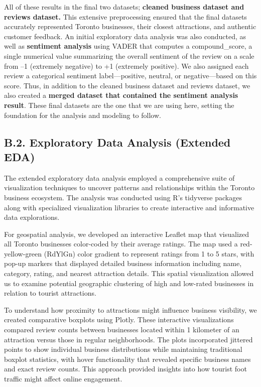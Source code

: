 \documentclass[
]{article}
\begin{document}
All of these results in the final two datasets; \textbf{cleaned business
dataset and reviews dataset.} This extensive preprocessing ensured that
the final datasets accurately represented Toronto businesses, their
closest attractions, and authentic customer feedback. An initial
exploratory data analysis was also conducted, as well as
\textbf{sentiment analysis} using VADER that computes a compound\_score,
a single numerical value summarizing the overall sentiment of the review
on a scale from --1 (extremely negative) to +1 (extremely positive). We
also assigned each review a categorical sentiment label---positive,
neutral, or negative---based on this score. Thus, in addition to the
cleaned business dataset and reviews dataset, we also created a
\textbf{merged dataset that contained the sentiment analysis result}.
These final datasets are the one that we are using here, setting the
foundation for the analysis and modeling to follow.

\subsection{B.2. Exploratory Data Analysis (Extended
EDA)}\label{b.2.-exploratory-data-analysis-extended-eda}

The extended exploratory data analysis employed a comprehensive suite of
visualization techniques to uncover patterns and relationships within
the Toronto business ecosystem. The analysis was conducted using R's
tidyverse packages along with specialized visualization libraries to
create interactive and informative data explorations.

For geospatial analysis, we developed an interactive Leaflet map that
visualized all Toronto businesses color-coded by their average ratings.
The map used a red-yellow-green (RdYlGn) color gradient to represent
ratings from 1 to 5 stars, with pop-up markers that displayed detailed
business information including name, category, rating, and nearest
attraction details. This spatial visualization allowed us to examine
potential geographic clustering of high and low-rated businesses in
relation to tourist attractions.

To understand how proximity to attractions might influence business
visibility, we created comparative boxplots using Plotly. These
interactive visualizations compared review counts between businesses
located within 1 kilometer of an attraction versus those in regular
neighborhoods. The plots incorporated jittered points to show individual
business distributions while maintaining traditional boxplot statistics,
with hover functionality that revealed specific business names and exact
review counts. This approach provided insights into how tourist foot
traffic might affect online engagement.
\end{document}
